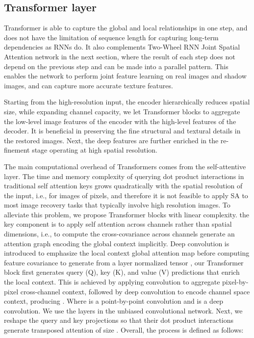 \documentclass[journal]{IEEEtran}
\begin{document}
\subsection{Transformer layer }
Transformer is able to capture the global and local relationships in one step, and does not have the limitation of sequence length for capturing long-term dependencies as RNNs do. It also complements Two-Wheel RNN Joint Spatial Attention network in the next section, where the result of each step does not depend on the previous step and can be made into a parallel pattern. This enables the network to perform joint feature learning on real images and shadow images, and can capture more accurate texture features.
\par
Starting from the high-resolution input, the encoder hierarchically reduces spatial size, while expanding channel capacity, we let Transformer blocks to aggregate the
low-level image features of the encoder with the high-level features of the decoder. It is beneficial in preserving the fine structural and textural details in the restored images. Next, the deep features are further enriched in the re-finement stage operating at high spatial resolution.
\par
The main computational overhead of Transformers comes from the self-attentive layer. The time and memory complexity of querying dot product interactions in traditional self attention keys grows quadratically with the spatial resolution of the input, i.e., for images of  pixels, and therefore it is not feasible to apply SA to most image recovery tasks that typically involve high resolution images.
To alleviate this problem, we propose Transformer blocks with linear complexity. the key component is to apply self attention across channels rather than spatial dimensions, i.e., to compute the cross-covariance across channels generate an attention graph encoding the global context implicitly. Deep convolution is introduced to emphasize the local context global attention map before computing feature covariance to generate from a layer normalized tensor , our Transformer block first generates query (Q), key (K), and value (V) predictions that enrich the local context. This is achieved by applying  convolution to aggregate pixel-by-pixel cross-channel context, followed by  deep convolution to encode channel space context, producing  . Where  is a  point-by-point convolution and  is a  deep convolution. We use the layers in the unbiased convolutional network. Next, we reshape the query and key projections so that their dot product interactions generate transposed attention of size . Overall, the process is defined as follows:
\end{document}
